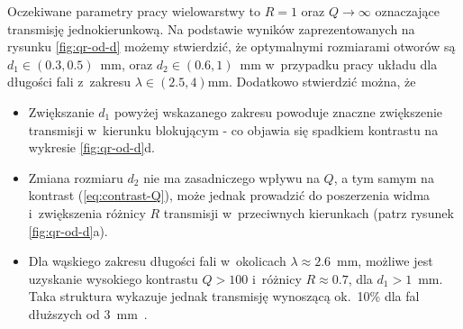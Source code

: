 Oczekiwane parametry pracy wielowarstwy to $R=1$ oraz $Q \to \infty$ oznaczające transmisję jednokierunkową. Na podstawie wyników zaprezentowanych na rysunku \ref{fig:qr-od-d} możemy stwierdzić, że optymalnymi rozmiarami otworów są $d_1\in(0.3,0.5)$~mm, oraz $d_2\in(0.6,1)$~mm w~przypadku pracy układu dla długości fali z~zakresu $\lambda \in (2.5, 4)$mm. Dodatkowo stwierdzić można, że
\begin{itemize}
	\item Zwiększanie $d_1$ powyżej wskazanego zakresu powoduje znaczne zwiększenie transmisji w~kierunku blokującym - co objawia się spadkiem kontrastu na wykresie \ref{fig:qr-od-d}d.
	\item Zmiana rozmiaru $d_2$ nie ma zasadniczego wpływu na $Q$, a tym samym na kontrast (\ref{eq:contrast-Q}), może jednak prowadzić do poszerzenia widma i~zwiększenia różnicy $R$ transmisji w~przeciwnych kierunkach (patrz rysunek \ref{fig:qr-od-d}a).
	\item Dla wąskiego zakresu długości fali w~okolicach $\lambda\approx2.6$~mm, możliwe jest uzyskanie wysokiego kontrastu $Q>100$ i~różnicy ${R\approx 0.7}$, dla ${d_1>1}$~mm. Taka struktura wykazuje jednak transmisję wynoszącą ok.~10\% dla fal dłuższych od $3$~mm~\cite{stolarek2013broadband}.
\end{itemize}
